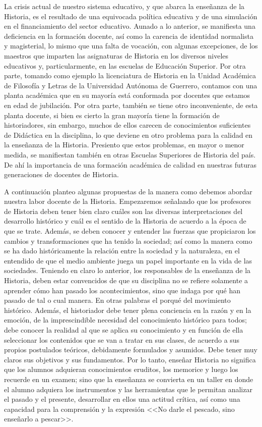 La crisis actual de nuestro sistema educativo, y que abarca la 
enseñanza de la Historia, es el resultado de una equivocada política 
educativa y de una simulación en el financiamiento del sector 
educativo.  Aunado a lo anterior, se manifiesta una deficiencia en la 
formación docente, así como la carencia de identidad normalista y 
magisterial, lo mismo que una falta de vocación, con algunas 
excepciones, de los maestros que imparten las asignaturas de Historia 
en los diversos niveles educativos y, particularmente, en las escuelas 
de Educación Superior. Por otra parte, tomando como ejemplo la 
licenciatura de Historia en la Unidad Académica de Filosofía y Letras 
de la Universidad Autónoma de Guerrero, contamos con una planta 
académica que en su mayoría está conformada por docentes que estamos en 
edad de jubilación. Por otra parte, también se tiene otro 
inconveniente, de esta planta docente, si bien es cierto la gran 
mayoría tiene la formación de historiadores, sin embargo, muchos de 
ellos carecen de conocimientos suficientes de Didáctica en la 
disciplina, lo que deviene en otro problema para la calidad en la 
enseñanza de la Historia. Presiento que estos problemas, en mayor o 
menor medida,  se manifiestan también en otras Escuelas Superiores de 
Historia del país. De ahí la importancia de una formación académica de 
calidad en nuestras futuras generaciones de docentes de Historia. 

A continuación planteo algunas propuestas de la manera como debemos 
abordar nuestra labor docente de la Historia. Empezaremos señalando que 
los profesores de Historia deben tener bien claro cuáles son las 
diversas interpretaciones del desarrollo histórico y cuál es el sentido 
de la Historia de acuerdo a la época de que se trate. Además, se deben 
conocer y entender las fuerzas que propiciaron los cambios y 
transformaciones que ha tenido la sociedad; así como la manera como se 
ha dado históricamente la relación entre la sociedad y la naturaleza, 
en el entendido de que el medio ambiente juega un papel importante en 
la vida de las sociedades. Teniendo en claro lo anterior, los 
responsables de la enseñanza de la Historia, deben estar convencidos de 
que su disciplina no se refiere solamente a aprender cómo han pasado 
los acontecimientos, sino que indaga por qué han pasado de tal o cual 
manera. En otras palabras el porqué del movimiento histórico. Además, 
el historiador debe tener plena conciencia en la razón y en la emoción, 
de la imprescindible necesidad del conocimiento histórico para todos; 
debe conocer la realidad al que se aplica su conocimiento y en función 
de ella seleccionar los contenidos que se van a tratar en sus clases, 
de acuerdo a sus propios postulados teóricos, debidamente formulados y 
asumidos. Debe tener muy claros sus objetivos y sus fundamentos. Por lo 
tanto, enseñar Historia no significa que los alumnos adquieran 
conocimientos eruditos, los memorice y luego los recuerde en un examen; 
sino que la enseñanza se convierta en un taller en donde el alumno 
adquiera los instrumentos y las herramientas que le permitan analizar 
el pasado y el presente, desarrollar en ellos una actitud crítica, así 
como una capacidad para la comprensión y la expresión <<No darle el 
pescado, sino enseñarlo a pescar>>.                       

